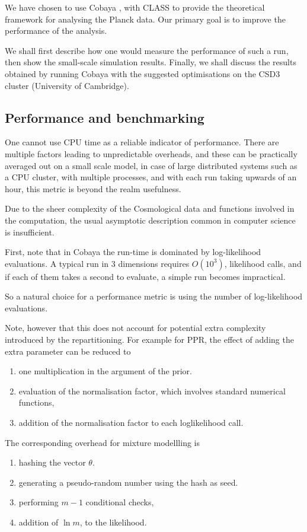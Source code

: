 \documentclass[usenatbib]{mnras}
\begin{document}
We have chosen to use Cobaya \citep{cobaya}, with CLASS to provide the
theoretical framework for analysing the Planck \citep{planck}
data. Our primary goal is to improve the performance of the
analysis.

We shall first describe how one would measure the performance of
such a run, then show the small-scale simulation results. Finally,
we shall discuss the results obtained by running Cobaya with the
suggested optimisations on the CSD3 cluster (University of Cambridge).


\subsection{Performance and benchmarking}
\label{sec:orgd9f0053}
One cannot use CPU time as a reliable indicator of
performance. There are multiple factors leading to unpredictable
overheads, and these can be practically averaged out on a small
scale model, in case of large distributed systems such as a CPU
cluster, with multiple processes, and with each run taking upwards
of an hour, this metric is beyond the realm usefulness.

Due to the sheer complexity of the Cosmological data and functions
involved in the computation, the usual asymptotic description
common in computer science is insufficient. 

First, note that in Cobaya  the run-time is dominated
by log-likelihood evaluations. A typical run in 3 dimensions
requires \(O(10^{3})\), likelihood calls, and if each of them takes a
second to evaluate, a simple run becomes impractical. 

So a natural choice for a performance metric is using the number of
log-likelihood evaluations. 

Note, however that this does not account for potential extra
complexity introduced by the repartitioning. For example for PPR,
the effect of adding the extra parameter can be reduced to
\begin{enumerate}
\item one multiplication in the argument of the prior.
\item evaluation of the normalisation factor, which involves standard
numerical functions,
\item addition of the normalisation factor to each loglikelihood call.
\end{enumerate}

The corresponding overhead for mixture modellling is
\begin{enumerate}
\item hashing the vector \(\theta\).
\item generating a pseudo-random number using the hash as seed.
\item performing \(m-1\) conditional checks,
\item addition of \(\ln m\), to the likelihood.
\end{enumerate}
\end{document}

